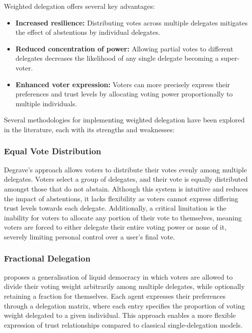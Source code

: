 Weighted delegation offers several key advantages:
\begin{itemize}
  \item \textbf{Increased resilience:} Distributing votes across multiple delegates mitigates the effect of abstentions by individual delegates.
  \item \textbf{Reduced concentration of power:} Allowing partial votes to different delegates decreases the likelihood of any single delegate becoming a super-voter.
  \item \textbf{Enhanced voter expression:} Voters can more precisely express their preferences and trust levels by allocating voting power proportionally to multiple individuals.
\end{itemize}

Several methodologies for implementing weighted delegation have been explored in the literature, each with its strengths and weaknesses:

\subsubsection*{Equal Vote Distribution~\citep{degrave2014}}
Degrave's approach allows voters to distribute their votes evenly among multiple delegates. Voters select a group of delegates, and their vote is equally distributed amongst those that do not abstain.
Although this system is intuitive and reduces the impact of abstentions, it lacks flexibility as voters cannot express differing trust levels towards each delegate. Additionally, a critical limitation is the inability for voters to allocate any portion of their vote to themselves, meaning voters are forced to either delegate their entire voting power or none of it, severely limiting personal control over a user's final vote.

\subsubsection{Fractional Delegation~\citep{bersetche2024}}

\citeauthor{bersetche2024} proposes a generalisation of liquid democracy in which voters are allowed to divide their voting weight arbitrarily among multiple delegates, while optionally retaining a fraction for themselves. Each agent expresses their preferences through a delegation matrix, where each entry specifies the proportion of voting weight delegated to a given individual. This approach enables a more flexible expression of trust relationships compared to classical single-delegation models.


